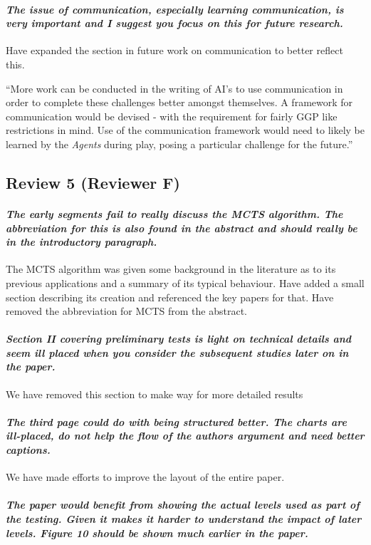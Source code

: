 \documentclass{article}
\begin{document}
\paragraph*{\textit{The issue of communication, especially learning communication, is very important and I suggest you focus on this for future research.}}
Have expanded the section in future work on communication to better reflect this.

``More work can be conducted in the writing of AI's to use communication in order to complete these challenges better amongst themselves. A framework for communication would be devised - with the requirement for fairly GGP like restrictions in mind. Use of the communication framework would need to likely be learned by the \emph{Agents} during play, posing a particular challenge for the future.''
\subsection{Review 5 (Reviewer F)}
\paragraph*{\textit{The early segments fail to really discuss the MCTS algorithm.  The abbreviation for this is also found in the abstract and should really be in the introductory paragraph.}}
The MCTS algorithm was given some background in the literature as to its previous applications and a summary of its typical behaviour. Have added a small section describing its creation and referenced the key papers for that.
Have removed the abbreviation for MCTS from the abstract.
\paragraph*{\textit{Section II covering preliminary tests is light on technical details and seem ill placed when you consider the subsequent studies later on in the paper.}}
We have removed this section to make way for more detailed results
\paragraph*{\textit{The third page could do with being structured better.  The charts are ill-placed, do not help the flow of the authors argument and need better captions.}}
We have made efforts to improve the layout of the entire paper.
\paragraph*{\textit{The paper would benefit from showing the actual levels used as part of the testing.  Given it makes it harder to understand the impact of later levels.  Figure 10 should be shown much earlier in the paper.}}
\end{document}
